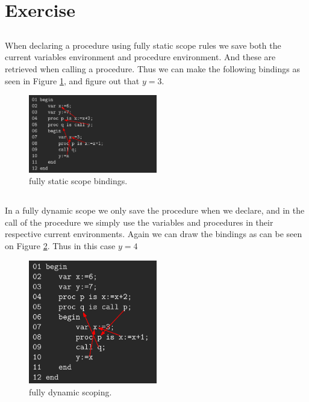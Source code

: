 \documentclass[12pt]{article}
\begin{document}
\section{Exercise}
\subsection{}
When declaring a procedure using fully static scope rules we save both the current variables environment and procedure environment. And these are retrieved when calling a procedure. Thus we can make the following bindings as seen in Figure \ref{fig:fullystatic}, and figure out that $y = 3$.

\begin{figure}
        \centering
        \includegraphics[width=0.5\textwidth]{fullystatic.png}
        \caption{fully static scope bindings.}
        \label{fig:fullystatic}
\end{figure}

\subsection{}
In a fully dynamic scope we only save the procedure when we declare, and in the call of the procedure we simply use the variables and procedures in their respective current environments. Again we can draw the bindings as can be seen on Figure \ref{fig:fullydynamic}. Thus in this case $y=4$

\begin{figure}
        \centering
        \includegraphics[width=0.5\textwidth]{fullydynamic.png}
        \caption{fully dynamic scoping.}
        \label{fig:fullydynamic}
\end{figure}
\end{document}

